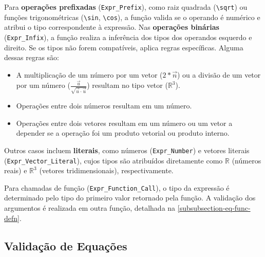 

Para \textbf{operações prefixadas} (\verb"Expr_Prefix"), como raiz quadrada (\verb"\sqrt") ou funções trigonométricas (\verb"\sin", \verb"\cos"), a função valida se o operando é numérico e atribui o tipo correspondente à expressão. Nas \textbf{operações binárias} (\verb"Expr_Infix"), a função realiza a inferência dos tipos dos operandos esquerdo e direito. Se os tipos não forem compatíveis, aplica regras específicas. Alguma dessas regras são:

\begin{itemize}
    \item A multiplicação de um número por um vetor ($2*\vec{n}$) ou a divisão de um vetor por um número ($\frac{\vec{u}}{\sqrt{\vec{u} \cdot \vec{u}}}$) resultam no tipo vetor ($\mathbb{R}^3$).
    \item Operações entre dois números resultam em um número.
    \item Operações entre dois vetores resultam em um número ou um vetor a depender se a operação foi um produto vetorial ou produto interno.
\end{itemize}

Outros casos incluem \textbf{literais}, como números (\verb"Expr_Number") e vetores literais \\(\verb"Expr_Vector_Literal"), cujos tipos são atribuídos diretamente como $\mathbb{R}$ (números reais) e $\mathbb{R}^3$ (vetores tridimensionais), respectivamente.



Para chamadas de função (\verb"Expr_Function_Call"), o tipo da expressão é determinado pelo tipo do primeiro valor retornado pela função. A validação dos argumentos é realizada em outra função, detalhada na \autoref{subsubsection-eq-func-defn}. %


\subsection{Validação de Equações}

